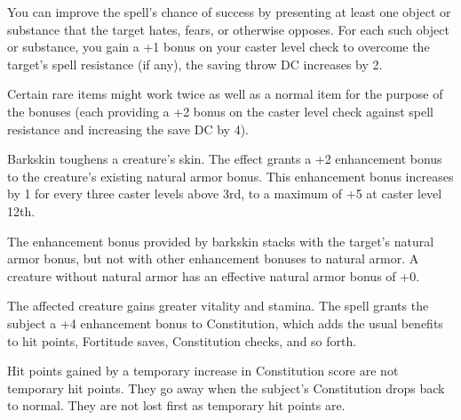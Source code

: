 \begin{multicols}{2}
\begin{small}
\smallskip\noindent You can improve the spell's chance of success by presenting at least one object or substance that the target hates, fears, or otherwise opposes. For each such object or substance, you gain a +1 bonus on your caster level check to overcome the target's spell resistance (if any), the saving throw DC increases by 2. 

\smallskip\noindent Certain rare items might work twice as well as a normal item for the purpose of the bonuses (each providing a +2 bonus on the caster level check against spell resistance and increasing the save DC by 4).


\noindent Barkskin toughens a creature's skin. The effect grants a +2 enhancement bonus to the creature's existing natural armor bonus. This enhancement bonus increases by 1 for every three caster levels above 3rd, to a maximum of +5 at caster level 12th.

\smallskip\noindent The enhancement bonus provided by barkskin stacks with the target's natural armor bonus, but not with other enhancement bonuses to natural armor. A creature without natural armor has an effective natural armor bonus of +0.

\noindent The affected creature gains greater vitality and stamina. The spell grants the subject a +4 enhancement bonus to Constitution, which adds the usual benefits to hit points, Fortitude saves, Constitution checks, and so forth.

\smallskip\noindent Hit points gained by a temporary increase in Constitution score are not temporary hit points. They go away when the subject's Constitution drops back to normal. They are not lost first as temporary hit points are.


\end{small}
\end{multicols}
